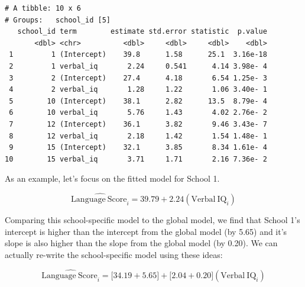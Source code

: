 \documentclass[]{book}
\newenvironment{Shaded}{\begin{snugshade}}{\end{snugshade}}
\newcommand{\CommentTok}[1]{\textcolor[rgb]{0.56,0.35,0.01}{\textit{#1}}}
\newcommand{\DataTypeTok}[1]{\textcolor[rgb]{0.13,0.29,0.53}{#1}}
\newcommand{\DecValTok}[1]{\textcolor[rgb]{0.00,0.00,0.81}{#1}}
\newcommand{\KeywordTok}[1]{\textcolor[rgb]{0.13,0.29,0.53}{\textbf{#1}}}
\newcommand{\NormalTok}[1]{#1}
\newcommand{\OperatorTok}[1]{\textcolor[rgb]{0.81,0.36,0.00}{\textbf{#1}}}
\newcommand{\StringTok}[1]{\textcolor[rgb]{0.31,0.60,0.02}{#1}}
\begin{document}
\begin{Shaded}
\end{Shaded}

\begin{verbatim}
# A tibble: 10 x 6
# Groups:   school_id [5]
   school_id term        estimate std.error statistic  p.value
       <dbl> <chr>          <dbl>     <dbl>     <dbl>    <dbl>
 1         1 (Intercept)    39.8      1.58      25.1  3.16e-18
 2         1 verbal_iq       2.24     0.541      4.14 3.98e- 4
 3         2 (Intercept)    27.4      4.18       6.54 1.25e- 3
 4         2 verbal_iq       1.28     1.22       1.06 3.40e- 1
 5        10 (Intercept)    38.1      2.82      13.5  8.79e- 4
 6        10 verbal_iq       5.76     1.43       4.02 2.76e- 2
 7        12 (Intercept)    36.1      3.82       9.46 3.43e- 7
 8        12 verbal_iq       2.18     1.42       1.54 1.48e- 1
 9        15 (Intercept)    32.1      3.85       8.34 1.61e- 4
10        15 verbal_iq       3.71     1.71       2.16 7.36e- 2
\end{verbatim}

As an example, let's focus on the fitted model for School 1.

\[
\hat{\mathrm{Language~Score}_i} = 39.79 + 2.24(\mathrm{Verbal~IQ}_i)
\]

Comparing this school-specific model to the global model, we find that School 1's intercept is higher than the intercept from the global model (by 5.65) and it's slope is also higher than the slope from the global model (by 0.20). We can actually re-write the school-specific model using these ideas:

\[
\hat{\mathrm{Language~Score}_i} = \bigg[34.19 + 5.65\bigg] + \bigg[2.04 + 0.20\bigg](\mathrm{Verbal~IQ}_i)
\]
\end{document}
